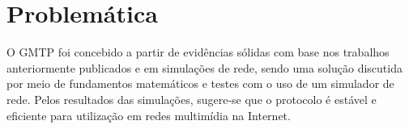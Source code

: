 


% 
% 
% 
% 



\section{Problemática}
\label{sec:problem}

O GMTP foi concebido a partir de evidências sólidas com base nos trabalhos anteriormente publicados e em simulações de rede, sendo uma solução discutida por meio de fundamentos matemáticos e testes com o uso de um simulador de rede.
Pelos resultados das simulações, sugere-se que o protocolo é estável e eficiente para utilização em redes multimídia na Internet.

